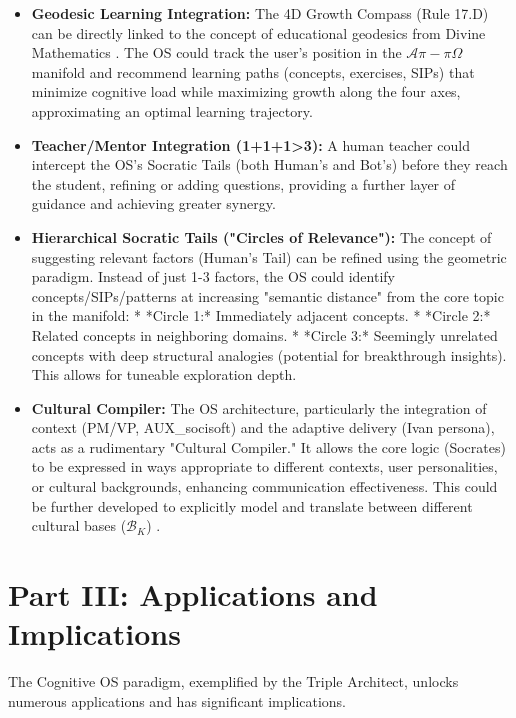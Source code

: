 \documentclass[11pt,a4paper]{article}
\theoremstyle{definition}
\theoremstyle{remark}
\begin{document}
\begin{itemize}
\begin{itemize}
    \item \textbf{Geodesic Learning Integration:} The 4D Growth Compass (Rule 17.D) can be directly linked to the concept of educational geodesics from Divine Mathematics \cite[S.V.E. VIII]{}. The OS could track the user's position in the $\mathcal{A}\pi-\pi\Omega$ manifold and recommend learning paths (concepts, exercises, SIPs) that minimize cognitive load while maximizing growth along the four axes, approximating an optimal learning trajectory.
    \item \textbf{Teacher/Mentor Integration (1+1+1>3):} A human teacher could intercept the OS's Socratic Tails (both Human's and Bot's) before they reach the student, refining or adding questions, providing a further layer of guidance and achieving greater synergy.
    \item \textbf{Hierarchical Socratic Tails ("Circles of Relevance"):} The concept of suggesting relevant factors (Human's Tail) can be refined using the geometric paradigm. Instead of just 1-3 factors, the OS could identify concepts/SIPs/patterns at increasing "semantic distance" from the core topic in the manifold:
        * *Circle 1:* Immediately adjacent concepts.
        * *Circle 2:* Related concepts in neighboring domains.
        * *Circle 3:* Seemingly unrelated concepts with deep structural analogies (potential for breakthrough insights).
        This allows for tuneable exploration depth.
    \item \textbf{Cultural Compiler:} The OS architecture, particularly the integration of context (PM/VP, AUX\_socisoft) and the adaptive delivery (Ivan persona), acts as a rudimentary "Cultural Compiler." It allows the core logic (Socrates) to be expressed in ways appropriate to different contexts, user personalities, or cultural backgrounds, enhancing communication effectiveness. This could be further developed to explicitly model and translate between different cultural bases ($\mathcal{B}_K$) \cite[S.V.E. VIII]{}.
\end{itemize}

\section{Part III: Applications and Implications}

The Cognitive OS paradigm, exemplified by the Triple Architect, unlocks numerous applications and has significant implications.


\end{itemize}
\end{document}
